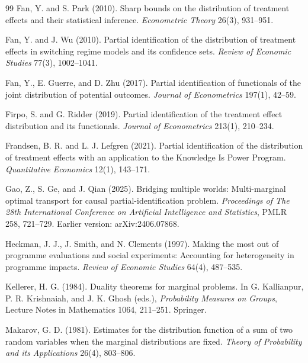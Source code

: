 \documentclass[11pt]{article}
\theoremstyle{definition}
\theoremstyle{plain}
\theoremstyle{remark}
\begin{document}
\begin{thebibliography}{99}
Fan, Y. and S. Park (2010).
Sharp bounds on the distribution of treatment effects and their statistical
inference.
\emph{Econometric Theory} 26(3), 931--951.

Fan, Y. and J. Wu (2010).
Partial identification of the distribution of treatment effects in switching
regime models and its confidence sets.
\emph{Review of Economic Studies} 77(3), 1002--1041.

Fan, Y., E. Guerre, and D. Zhu (2017).
Partial identification of functionals of the joint distribution of potential
outcomes.
\emph{Journal of Econometrics} 197(1), 42--59.

Firpo, S. and G. Ridder (2019).
Partial identification of the treatment effect distribution and its functionals.
\emph{Journal of Econometrics} 213(1), 210--234.

Frandsen, B. R. and L. J. Lefgren (2021).
Partial identification of the distribution of treatment effects with an
application to the Knowledge Is Power Program.
\emph{Quantitative Economics} 12(1), 143--171.

Gao, Z., S. Ge, and J. Qian (2025).
Bridging multiple worlds: Multi-marginal optimal transport for causal
partial-identification problem.
\emph{Proceedings of The 28th International Conference on Artificial
Intelligence and Statistics}, PMLR 258, 721--729.  Earlier version:
arXiv:2406.07868.

Heckman, J. J., J. Smith, and N. Clements (1997).
Making the most out of programme evaluations and social experiments: Accounting
for heterogeneity in programme impacts.
\emph{Review of Economic Studies} 64(4), 487--535.

Kellerer, H. G. (1984).
Duality theorems for marginal problems.
In G. Kallianpur, P. R. Krishnaiah, and J. K. Ghosh (eds.),
\emph{Probability Measures on Groups}, Lecture Notes in Mathematics 1064,
211--251. Springer.

Makarov, G. D. (1981).
Estimates for the distribution function of a sum of two random variables when
the marginal distributions are fixed.
\emph{Theory of Probability and its Applications} 26(4), 803--806.


\end{thebibliography}
\end{document}
